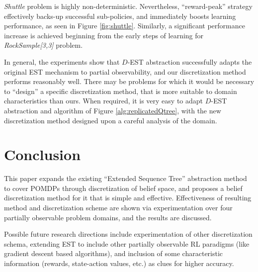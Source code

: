 \documentclass[10pt, conference, compsocconf]{IEEEtran}
\begin{document}
\textit{Shuttle} problem is highly non-deterministic. Nevertheless, ``reward-peak'' strategy effectively backs-up successful sub-policies, and immediately boosts learning performance, as seen in Figure \ref{fig:shuttle}. Similarly, a significant performance increase is achieved beginning from the early steps of learning for \textit{RockSample[3,3]} problem.


In general, the experiments show that $D$-EST abstraction successfully adapts the original EST mechanism to partial observability, and our discretization method performs reasonably well. There may be problems for which it would be necessary to ``design'' a specific discretization method, that is more suitable to domain characteristics than ours. When required, it is very easy to adapt $D$-EST abstraction and algorithm of Figure \ref{alg:replicatedQtree}, with the new discretization method designed upon a careful analysis of the domain.


\section{Conclusion}
\label{sec:conclusion}
This paper expands the existing ``Extended Sequence Tree'' abstraction method to cover POMDPs through discretization of belief space, and proposes a belief discretization method for it that is simple and effective. Effectiveness of resulting method and discretization scheme are shown via experimentation over four partially observable problem domains, and the results are discussed.

Possible future research directions include experimentation of other discretization schema, extending EST to include other partially observable RL paradigms (like gradient descent based algorithms), and inclusion of some  characteristic information (rewards, state-action values, etc.) as clues for higher accuracy.






\end{document}
